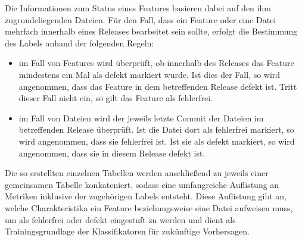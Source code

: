 \begin{table}[H]
\centering
{}
\end{table}

Die Informationen zum Status eines Features basieren dabei auf den ihm zugrundeliegenden Dateien. Für den Fall, dass ein Feature oder eine Datei mehrfach innerhalb eines Releases bearbeitet sein sollte, erfolgt die Bestimmung des Labels anhand der folgenden Regeln:

\begin{itemize}
\setlength{\itemsep}{-2pt}
\item im Fall von Features wird überprüft, ob innerhalb des Releases das Feature mindestens ein Mal als \glqq defekt\grqq{} markiert wurde. Ist dies der Fall, so wird angenommen, dass das Feature in dem betreffenden Release defekt ist. Tritt dieser Fall nicht ein, so gilt das Feature als fehlerfrei.
\item im Fall von Dateien wird der jeweils letzte Commit der Dateien im betreffenden Release überprüft. Ist die Datei dort als \glqq fehlerfrei\grqq{} markiert, so wird angenommen, dass sie fehlerfrei ist. Ist sie als \glqq defekt\grqq{} markiert, so wird angenommen, dass sie in diesem Release defekt ist.
\end{itemize}

Die so erstellten einzelnen Tabellen werden anschließend zu jeweils einer gemeinsamen Tabelle konkateniert, sodass eine umfangreiche Auflistung an Metriken inklusive der zugehörigen Labels entsteht. Diese Auflistung gibt an, welche Charakteristika ein Feature beziehungsweise eine Datei aufweisen muss, um als \glqq fehlerfrei\grqq{} oder \glqq defekt\grqq{} eingestuft zu werden und dient als Trainingsgrundlage der Klassifikatoren für zukünftige Vorhersagen.

